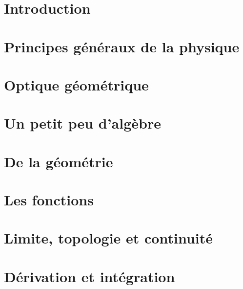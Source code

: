 





\makeindex






\tableofcontents

\chapter{Introduction}
	

\chapter{Principes généraux de la physique}
	
	

\chapter{Optique géométrique}
	
	
	
	
	

\chapter{Un petit peu d'algèbre}
	
	 

\chapter{De la géométrie}
	

\chapter{Les fonctions}
	

\chapter{Limite, topologie et continuité}	
	
	
	
	

\chapter{Dérivation et intégration}
	

